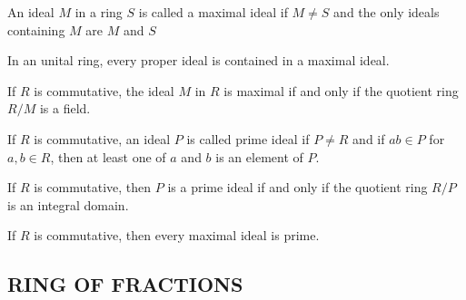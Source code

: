 \begin{definition}
	An ideal $M$ in a ring $S$ is called a maximal ideal if $M \neq S$ and the only ideals containing $M$ are $M$ and $S$
	
\end{definition}

\begin{proposition}
	In an unital ring, every proper ideal is contained in a maximal ideal. 
\end{proposition}

\begin{proposition}
	If $R$ is commutative, the ideal $M$ in $R$ is maximal if and only if the quotient ring $R/M$ is a field.
\end{proposition}

\begin{definition}
	If $R$ is commutative, an ideal $P$ is called prime ideal if $P \neq R$ and if $ab \in P$ for $a, b \in R$, then at least one of $a$ and $b$ is an element of $P$.
	
\end{definition}

\begin{proposition}
	If $R$ is commutative, then $P$ is a prime ideal if and only if the quotient ring $R/P$ is an integral domain.
\end{proposition}

\begin{corollary}
	If $R$ is commutative, then every maximal ideal is prime.
\end{corollary}

\subsection{RING OF FRACTIONS}

